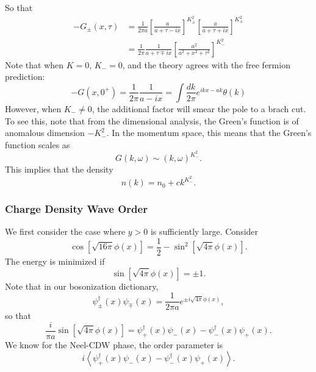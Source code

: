 So that
\begin{equation}
\begin{aligned}
	-G_{\pm}(x,\tau) 
	&= \frac{1}{2\pi a} \left[\frac{a}{a + \tau - ix}\right]^{K_\pm^2} \left[\frac{a}{a + \tau + i x}\right]^{K_\mp^2} \\
	&= \frac{1}{2\pi} \frac{1}{a + \tau \mp ix} \left[\frac{a^2}{a^2+x^2+\tau^2}\right]^{K_-^2}
\end{aligned}
\end{equation}
Note that when $K=0$, $K_-=0$, and the theory agrees with the free fermion prediction:
\begin{equation}
	-G(x, 0^+) = \frac{1}{2\pi} \frac{1}{a-ix}
	= \int \frac{dk}{2\pi} e^{ikx-ak} \theta(k)
\end{equation}
However, when $K_- \ne 0$, the additional factor will smear the pole to a brach cut. 
To see this, note that from the dimensional analysis, the Green's function is of anomalous dimension $-K_-^2$.
In the momentum space, this means that the Green's function scales as
\begin{equation}
	G(k,\omega) \sim (k,\omega)^{K_-^2}.
\end{equation}
This implies that the density 
\begin{equation}
	n(k) = n_0 + c k^{K_-^2}.
\end{equation}


\subsubsection{Charge Density Wave Order}
We first consider the case where $y>0$ is sufficiently large. 
Consider
\begin{equation}
	\cos\left[\sqrt{16\pi}\phi(x)\right] = \frac{1}{2} - \sin^2\left[\sqrt{4\pi}\phi(x)\right].
\end{equation}
The energy is minimized if 
\begin{equation}
	\sin\left[\sqrt{4\pi}\phi(x)\right] = \pm 1.
\end{equation}
Note that in our bosonization dictionary,
\begin{equation}
	\psi_{\pm}^\dagger(x)\psi_{\mp}(x) = \frac{1}{2\pi a} e^{\pm i\sqrt{4\pi}\phi(x)},
\end{equation}
so that
\begin{equation}
	\frac{i}{\pi a} \sin\left[\sqrt{4\pi}\phi(x)\right] = \psi_{+}^\dagger(x)\psi_{-}(x)-\psi_{-}^\dagger(x)\psi_{+}(x).
\end{equation}
We know for the Neel-CDW phase, the order parameter is
\begin{equation}
	i\left\langle \psi_{+}^\dagger(x)\psi_{-}(x)-\psi_{-}^\dagger(x)\psi_{+}(x) \right\rangle.
\end{equation}

